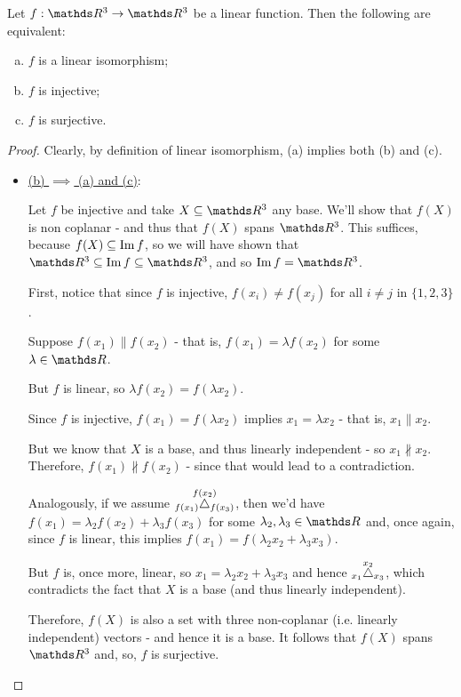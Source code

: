 \begin{theorem}
	Let $f:\R^3\to\R^3$ be a linear function. Then the following are equivalent:
	\begin{enumerate}[a)]
		\item $f$ is a linear isomorphism;
		\item $f$ is injective;
		\item $f$ is surjective.
	\end{enumerate}
\end{theorem}
\begin{proof}
	Clearly, by definition of linear isomorphism, (a) implies both (b) and (c).
	
	\begin{itemize}
		\item \underline{(b) $\implies$ (a) and (c)}:
		
		Let $f$ be injective and take $X\subseteq\R^3$ any base. We'll show that $f(X)$ is non coplanar - and thus that $f(X)$ spans $\R^3$. This suffices, because $f(X)\subseteq \im f$, so we will have shown that $\R^3\subseteq\im f\subseteq \R^3$, and so $\im f=\R^3$.
		
		First, notice that since $f$ is injective, $f(x_i)\neq f(x_j)$ for all $i\neq j$ in $\{1,2,3\}$.
		
		Suppose $f(x_1)\parallel f(x_2)$ - that is, $f(x_1)=\lambda f(x_2)$ for some $\lambda\in \R$.
		
		But $f$ is linear, so $\lambda f(x_2)=f(\lambda x_2)$.
		
		Since $f$ is injective, $f(x_1)=f(\lambda x_2)$ implies $x_1=\lambda x_2$ - that is, $x_1\parallel x_2$.
		
		But we know that $X$ is a base, and thus linearly independent - so $x_1\nparallel x_2$. Therefore, $f(x_1)\nparallel f(x_2)$ - since that would lead to a contradiction.
		
		
		\bigskip
		Analogously, if we assume $\plane{f(x_1)}{f(x_2)}{f(x_3)}$, then we'd have $f(x_1)=\lambda_2f(x_2)+\lambda_3f(x_3)$ for some $\lambda_2,\lambda_3\in \R$ and, once again, since $f$ is linear, this implies $f(x_1)=f(\lambda_2x_2+\lambda_3x_3)$.
		
		But $f$ is, once more, linear, so $x_1=\lambda_2x_2+\lambda_3x_3$ and hence $\plane{x_1}{x_2}{x_3}$, which contradicts the fact that $X$ is a base (and thus linearly independent).
		
		Therefore, $f(X)$ is also a set with three non-coplanar (i.e. linearly independent) vectors - and hence it is a base. It follows that $f(X)$ spans $\R^3$ and, so, $f$ is surjective.
		

\end{itemize}
\end{proof}

